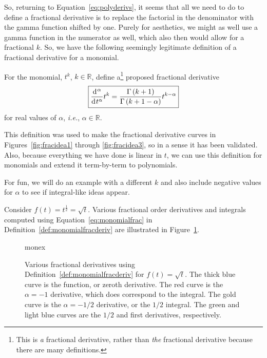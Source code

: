 So, returning to Equation~\ref{eq:polyderivs}, it seems that all we need to do to define a fractional derivative is to replace the factorial in the denominator with the gamma function shifted by one. Purely for aesthetics, we might as well use a gamma function in the numerator as well, which also then would allow for a fractional $k$. So, we have the following seemingly legitimate definition of a fractional derivative for a monomial.

\begin{definition}
  For the monomial, $t^k$, $k \in \mathbb R$, define a\footnote{This is \emph{a} fractional derivative, rather than \emph{the} fractional derivative because there are many definitions. } proposed fractional derivative 
  \begin{equation}
    \boxed{
    \frac{\operatorname{d}\hspace*{-1pt}^\alpha}{\operatorname{d}\hspace*{-1pt} t^\alpha} t^k = \frac{\Gamma\left( k + 1 \right)}{\Gamma \left( k + 1 - \alpha \right)} t^{k - \alpha} }
    \label{eq:monomialfrac}
  \end{equation}
  for real values of $\alpha$, \textit{i.e.}, $\alpha \in \mathbb R$.
  \label{def:monomialfracderiv}
\end{definition}

This definition was used to make the fractional derivative curves in Figures~\ref{fig:fracidea1} through
\ref{fig:fracidea3}, so in a sense it has been validated. Also, because everything we have done is linear in $t$, we can
use this definition for monomials and extend it term-by-term to polynomials. 

For fun, we will do an example with a different $k$ and also include negative values for $\alpha$ to see if integral-like ideas appear.

\begin{example}
  Consider $f(t) = t^\frac{1}{2} = \sqrt{t}$. Various fractional order derivatives and integrals computed using Equation~\ref{eq:monomialfrac} in Definition~\ref{def:monomialfracderiv} are illustrated in Figure~\ref{fig:monex}.

  \begin{figure}
    \centering
    {monex}
    \caption{Various fractional derivatives using Definition~\ref{def:monomialfracderiv} for $f(t) = \sqrt{t}$. The thick blue curve is the function, or zeroth derivative. The red curve is the $\alpha = -1$ derivative, which does correspond to the integral. The gold curve is the $\alpha = -1/2$ derivative, or the $1/2$ integral. The green and light blue curves are the $1/2$ and first derivatives, respectively.} 
    \label{fig:monex}
  \end{figure}
\end{example}


